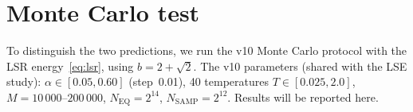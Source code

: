 \documentclass[11pt]{article}
\begin{document}
\section{Monte Carlo test}

To distinguish the two predictions, we run the v10 Monte Carlo protocol with the LSR energy~\eqref{eq:lsr}, using $b = 2+\sqrt{2}$.  The v10 parameters (shared with the LSE study): $\alpha \in [0.05, 0.60]$ (step~0.01), 40 temperatures $T \in [0.025, 2.0]$, $M = 10\,000$--$200\,000$, $N_{\mathrm{EQ}} = 2^{14}$, $N_{\mathrm{SAMP}} = 2^{12}$.  Results will be reported here.


\end{document}
